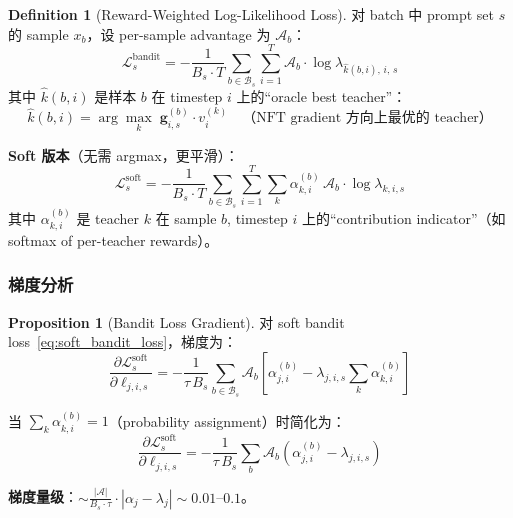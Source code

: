 \documentclass[11pt,a4paper]{article}
\newcommand{\loss}{\mathcal{L}}
\newcommand{\adv}{\mathcal{A}}
\theoremstyle{definition}
\newtheorem{definition}{Definition}
\newtheorem{proposition}{Proposition}
\begin{document}
\begin{definition}[Reward-Weighted Log-Likelihood Loss]
\label{def:reward_loss}
对 batch 中 prompt set $s$ 的 sample $x_b$，设 per-sample advantage 为 $\adv_b$：
\begin{equation}
\boxed{
\loss^{\mathrm{bandit}}_s = -\frac{1}{B_s \cdot T}\sum_{b \in \mathcal{B}_s}\sum_{i=1}^T \adv_b \cdot \log \lambda_{\hat{k}(b,i),\,i,\,s}
}
\label{eq:bandit_loss}
\end{equation}
其中 $\hat{k}(b,i)$ 是样本 $b$ 在 timestep $i$ 上的``oracle best teacher''：
\begin{equation}
\hat{k}(b,i) = \arg\max_k\; \mathbf{g}^{(b)}_{i,s} \cdot v^{(k)}_i \quad\text{（NFT gradient 方向上最优的 teacher）}
\end{equation}

\textbf{Soft 版本}（无需 argmax，更平滑）：
\begin{equation}
\boxed{
\loss^{\mathrm{soft}}_s = -\frac{1}{B_s \cdot T}\sum_{b \in \mathcal{B}_s}\sum_{i=1}^T \sum_k \alpha^{(b)}_{k,i}\, \adv_b \cdot \log \lambda_{k,i,s}
}
\label{eq:soft_bandit_loss}
\end{equation}
其中 $\alpha^{(b)}_{k,i}$ 是 teacher $k$ 在 sample $b$, timestep $i$ 上的``contribution indicator''（如 softmax of per-teacher rewards）。
\end{definition}

\subsubsection{梯度分析}

\begin{proposition}[Bandit Loss Gradient]
\label{prop:bandit_gradient}
对 soft bandit loss~\eqref{eq:soft_bandit_loss}，梯度为：
\begin{equation}
\boxed{
\frac{\partial \loss^{\mathrm{soft}}_s}{\partial \ell_{j,i,s}} = -\frac{1}{\tau\, B_s}\sum_{b \in \mathcal{B}_s} \adv_b \left[\alpha^{(b)}_{j,i} - \lambda_{j,i,s}\sum_k \alpha^{(b)}_{k,i}\right]
}
\label{eq:bandit_gradient}
\end{equation}

当 $\sum_k \alpha^{(b)}_{k,i} = 1$（probability assignment）时简化为：
\begin{equation}
\frac{\partial \loss^{\mathrm{soft}}_s}{\partial \ell_{j,i,s}} = -\frac{1}{\tau\, B_s}\sum_b \adv_b \left(\alpha^{(b)}_{j,i} - \lambda_{j,i,s}\right)
\label{eq:bandit_gradient_simple}
\end{equation}

\textbf{梯度量级}：$\sim \frac{|\adv|}{B_s \cdot \tau} \cdot |\alpha_j - \lambda_j| \sim 0.01$--$0.1$。
\end{proposition}
\end{document}
